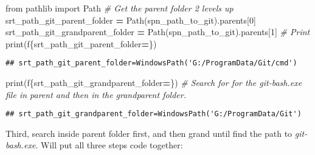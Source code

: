 \documentclass[
]{book}
\newenvironment{Shaded}{\begin{snugshade}}{\end{snugshade}}
\newcommand{\BuiltInTok}[1]{#1}
\newcommand{\CommentTok}[1]{\textcolor[rgb]{0.56,0.35,0.01}{\textit{#1}}}
\newcommand{\DecValTok}[1]{\textcolor[rgb]{0.00,0.00,0.81}{#1}}
\newcommand{\ImportTok}[1]{#1}
\newcommand{\NormalTok}[1]{#1}
\newcommand{\OperatorTok}[1]{\textcolor[rgb]{0.81,0.36,0.00}{\textbf{#1}}}
\newcommand{\SpecialCharTok}[1]{\textcolor[rgb]{0.00,0.00,0.00}{#1}}
\newcommand{\SpecialStringTok}[1]{\textcolor[rgb]{0.31,0.60,0.02}{#1}}
\begin{document}
\begin{Shaded}
\begin{Highlighting}[]
\ImportTok{from}\NormalTok{ pathlib }\ImportTok{import}\NormalTok{ Path}
\CommentTok{\# Get the parent folder 2 levels up}
\NormalTok{srt\_path\_git\_parent\_folder }\OperatorTok{=}\NormalTok{ Path(spn\_path\_to\_git).parents[}\DecValTok{0}\NormalTok{]}
\NormalTok{srt\_path\_git\_grandparent\_folder }\OperatorTok{=}\NormalTok{ Path(spn\_path\_to\_git).parents[}\DecValTok{1}\NormalTok{]}
\CommentTok{\# Print}
\BuiltInTok{print}\NormalTok{(}\SpecialStringTok{f\textquotesingle{}}\SpecialCharTok{\{}\NormalTok{srt\_path\_git\_parent\_folder}\OperatorTok{=}\SpecialCharTok{\}}\SpecialStringTok{\textquotesingle{}}\NormalTok{)}
\end{Highlighting}
\end{Shaded}

\begin{verbatim}
## srt_path_git_parent_folder=WindowsPath('G:/ProgramData/Git/cmd')
\end{verbatim}

\begin{Shaded}
\begin{Highlighting}[]
\BuiltInTok{print}\NormalTok{(}\SpecialStringTok{f\textquotesingle{}}\SpecialCharTok{\{}\NormalTok{srt\_path\_git\_grandparent\_folder}\OperatorTok{=}\SpecialCharTok{\}}\SpecialStringTok{\textquotesingle{}}\NormalTok{)}
\CommentTok{\# Search for for the git{-}bash.exe file in parent and then in the grandparent folder.}
\end{Highlighting}
\end{Shaded}

\begin{verbatim}
## srt_path_git_grandparent_folder=WindowsPath('G:/ProgramData/Git')
\end{verbatim}

Third, search inside parent folder first, and then grand until find the path to \emph{git-bash.exe}. Will put all three steps code together:
\end{document}
